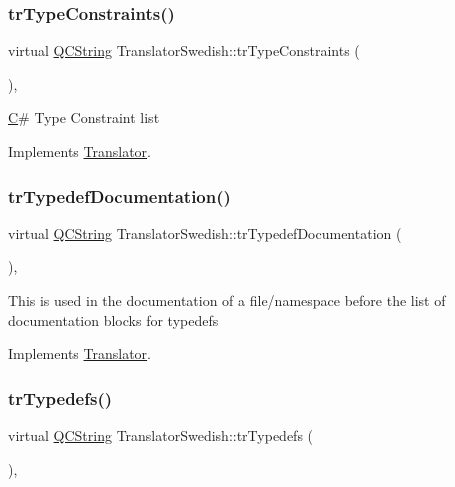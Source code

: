 \subsubsection{\texorpdfstring{trTypeConstraints()}{trTypeConstraints()}}
{\footnotesize\ttfamily virtual \mbox{\hyperlink{class_q_c_string}{Q\+C\+String}} Translator\+Swedish\+::tr\+Type\+Constraints (\begin{DoxyParamCaption}{ }\end{DoxyParamCaption})\hspace{0.3cm}{\ttfamily [inline]}, {\ttfamily [virtual]}}

\mbox{\hyperlink{class_c}{C}}\# Type Constraint list 

Implements \mbox{\hyperlink{class_translator}{Translator}}.

\mbox{\label{class_translator_swedish_afcaa3c5047d023063046883018eeafa9}} 
\subsubsection{\texorpdfstring{trTypedefDocumentation()}{trTypedefDocumentation()}}
{\footnotesize\ttfamily virtual \mbox{\hyperlink{class_q_c_string}{Q\+C\+String}} Translator\+Swedish\+::tr\+Typedef\+Documentation (\begin{DoxyParamCaption}{ }\end{DoxyParamCaption})\hspace{0.3cm}{\ttfamily [inline]}, {\ttfamily [virtual]}}

This is used in the documentation of a file/namespace before the list of documentation blocks for typedefs 

Implements \mbox{\hyperlink{class_translator}{Translator}}.

\mbox{\label{class_translator_swedish_aff354feef3023980fccb72d9a334d282}} 
\subsubsection{\texorpdfstring{trTypedefs()}{trTypedefs()}}
{\footnotesize\ttfamily virtual \mbox{\hyperlink{class_q_c_string}{Q\+C\+String}} Translator\+Swedish\+::tr\+Typedefs (\begin{DoxyParamCaption}{ }\end{DoxyParamCaption})\hspace{0.3cm}{\ttfamily [inline]}, {\ttfamily [virtual]}}

